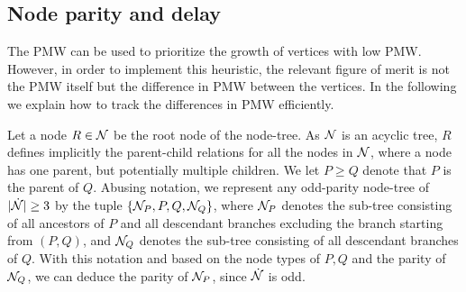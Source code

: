 \subsection{Node parity and delay}\label{sec:paritydelay}
The PMW can be used to prioritize the growth of vertices with low PMW. However, in order to implement this heuristic, the relevant figure of merit is not the PMW itself but the difference in PMW between the vertices. In the following we explain how to track the differences in PMW efficiently.



Let a node $R\in \mathcal{N}$ be the root node of the node-tree. As $\mathcal{N}$ is an acyclic tree, $R$ defines implicitly the parent-child relations for all the nodes in $\mathcal{N}$, where a node has one parent, but potentially multiple children. We let $P\geq Q$ denote that $P$ is the parent of $Q$. Abusing notation, we represent any odd-parity node-tree of $\lvert\dot{\mathcal{N}}\rvert\geq 3$ by the tuple $\{\mathcal{N}_P,P,Q,\mathcal{N}_Q\}$, where $\mathcal{N}_P$  denotes the sub-tree consisting of all ancestors of $P$ and all descendant branches excluding the branch starting from $(P,Q)$, and $\mathcal{N}_Q$ denotes the sub-tree consisting of all descendant branches of $Q$. With this notation  %
and based on the node types of $P,Q$ and the parity of $\mathcal{N}_Q$, we can deduce the parity of $\mathcal{N}_P$, since $\dot{\mathcal{N}}$ is odd. 

